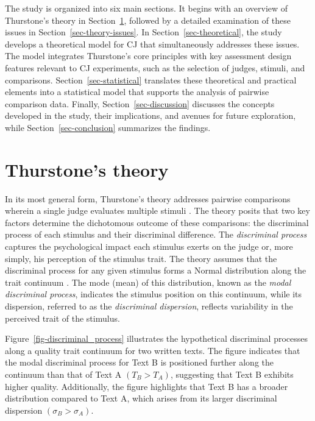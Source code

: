 \documentclass[
  authoryear,
  review,
  1p]{elsarticle}
\begin{document}
The study is organized into six main sections. It begins with an
overview of Thurstone's theory in Section~\ref{sec-thurstone_theory},
followed by a detailed examination of these issues in
Section~\ref{sec-theory-issues}. In Section~\ref{sec-theoretical}, the
study develops a theoretical model for CJ that simultaneously addresses
these issues. The model integrates Thurstone's core principles with key
assessment design features relevant to CJ experiments, such as the
selection of judges, stimuli, and comparisons.
Section~\ref{sec-statistical} translates these theoretical and practical
elements into a statistical model that supports the analysis of pairwise
comparison data. Finally, Section~\ref{sec-discussion} discusses the
concepts developed in the study, their implications, and avenues for
future exploration, while Section~\ref{sec-conclusion} summarizes the
findings.

\section{Thurstone's theory}\label{sec-thurstone_theory}

In its most general form, Thurstone's theory addresses pairwise
comparisons wherein a single judge evaluates multiple stimuli
\citep[pp.~267]{Thurstone_1927b}. The theory posits that two key factors
determine the dichotomous outcome of these comparisons: the discriminal
process of each stimulus and their discriminal difference. The
\emph{discriminal process} captures the psychological impact each
stimulus exerts on the judge or, more simply, his perception of the
stimulus trait. The theory assumes that the discriminal process for any
given stimulus forms a Normal distribution along the trait continuum
\citep[pp.~266]{Thurstone_1927b}. The mode (mean) of this distribution,
known as the \emph{modal discriminal process}, indicates the stimulus
position on this continuum, while its dispersion, referred to as the
\emph{discriminal dispersion}, reflects variability in the perceived
trait of the stimulus.

Figure~\ref{fig-discriminal_process} illustrates the hypothetical
discriminal processes along a quality trait continuum for two written
texts. The figure indicates that the modal discriminal process for Text
B is positioned further along the continuum than that of Text A
\((T_{B} > T_{A})\), suggesting that Text B exhibits higher quality.
Additionally, the figure highlights that Text B has a broader
distribution compared to Text A, which arises from its larger
discriminal dispersion \((\sigma_{B} > \sigma_{A})\).
\end{document}
